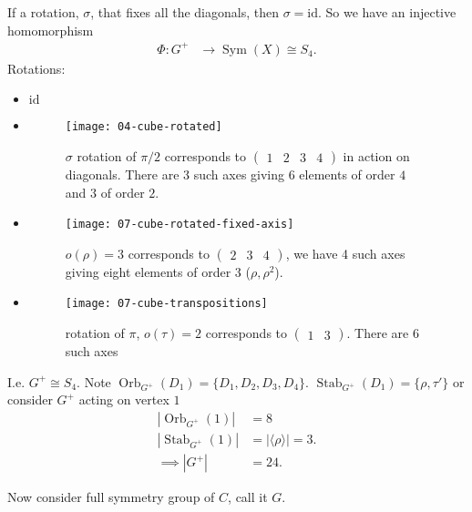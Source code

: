 If a rotation, $\sigma$, that fixes all the diagonals, then $\sigma = \text{id}$.
So we have an injective homomorphism
\begin{align*}
    \Phi : G^+ &\to \operatorname{Sym}(X) \cong S_4.
\end{align*} 
Rotations: 
\begin{itemize}
    \item $\text{id}$
    \item \begin{figure} 
        \centering 
        \texttt{[image: 04-cube-rotated]}
        \caption{$\sigma$ rotation of $\pi / 2$ corresponds to $\begin{pmatrix}1 & 2 & 3 & 4\end{pmatrix}$ in action on diagonals. There are $3$ such axes giving $6$ elements of order $4$ and $3$ of order $2$.}
    \end{figure}
    \item \begin{figure}
        \centering 
        \texttt{[image: 07-cube-rotated-fixed-axis]} 
        \caption{$o(\rho) = 3$ corresponds to $\begin{pmatrix}2 & 3 & 4\end{pmatrix}$, we have 4 such axes giving eight elements of order $3$ ($\rho, \rho^2$).}
    \end{figure}
    \item \begin{figure} 
        \centering 
        \texttt{[image: 07-cube-transpositions]}
        \caption{rotation of $\pi$, $o(\tau) = 2$ corresponds to $\begin{pmatrix}1 & 3\end{pmatrix}$. There are 6 such axes}
    \end{figure}
\end{itemize}
I.e. $G^+ \cong S_4$.
Note $\operatorname{Orb}_{G^+}(D_1) = \{ D_1, D_2, D_3, D_4 \}$.
$\operatorname{Stab}_{G^+}(D_1) = \{\rho, \tau'\}$
or consider $G^+$ acting on vertex $1$
\begin{align*}
    |\operatorname{Orb}_{G^+}(1)| &= 8 \\
    |\operatorname{Stab}_{G^+}(1)| &= |\langle \rho \rangle| = 3. \\
    \implies |G^+| &= 24.
\end{align*} 

Now consider full symmetry group of $C$, call it $G$.

